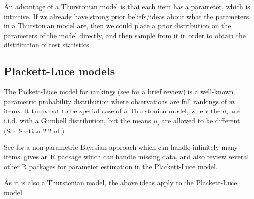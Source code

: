 \documentclass[10pt]{article}
\begin{document}
An advantage of a Thurstonian model is that each item has a parameter, which is intuitive. If we already have strong prior beliefs/ideas about what the parameters in a Thurstonian model are, then we could place a prior distribution on the parameters of the model directly, and then sample from it in order to obtain the distribution of test statistics.


\subsection{Plackett-Luce models}
\label{sec:pl}
The Packett-Luce model for rankings (see \cite{maystre2015fast} for a brief review) is a well-known parametric probability distribution where observations are full rankings of $m$ items. It turns out to be special case of a Thurstonian model, where the $d_i$ are i.i.d. with a Gumbell distribution, but the means $\mu_i$ are allowed to be different (See Section 2.2 of \cite{guiver2009bayesian}).

See \cite{caron2014bayesian} for a non-parametric Bayesian approach which can handle infinitely many items. \cite{turner2020modelling} gives an R package which can handle missing data, and also review several other R packages for parameter estimation in the Plackett-Luce model.

As it is also a Thurstonian model, the above ideas apply to the Plackett-Luce model.

\printbibliography
    
\end{document}
